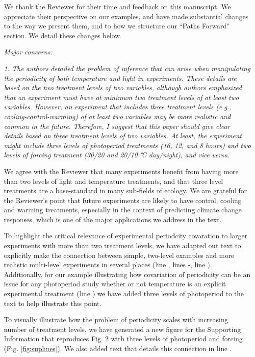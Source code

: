 \documentclass[11pt]{article}
\begin{document}
We thank the Reviewer for their time and feedback on this manuscript. We appreciate their perspective on our examples, and have made substantial changes to the way we present them, and to how we structure our ``Paths Forward" section. We detail these changes below.

\emph{Major concerns:}

\emph{1. The authors detailed the problem of inference that can arise when manipulating the periodicity of both temperature and light in experiments. These details are based on the two treatment levels of two variables, although authors emphasized that an experiment must have at minimum two treatment levels of at least two variables. However, an experiment that includes three treatment levels (e.g., cooling-control-warming) of at least two variables may be more realistic and common in the future. Therefore, I suggest that this paper should give clear details based on three treatment levels of two variables. At least, the experiment might include three levels of photoperiod treatments (16, 12, and 8 hours) and two levels of forcing treatment (30/20 and 20/10 ℃ day/night), and vice versa.}

We agree with the Reviewer that many experiments benefit from having more than two levels of light and temperature treatments, and that three level treatments are a base-standard in many sub-fields of ecology. We are grateful for the Reviewer's point that future experiments are likely to have control, cooling and warming treatments, especially in the context of predicting climate change responses, which is one of the major applications we address in the text.

To highlight the critical relevance of experimental periodcity covaration to larger experiments with more than two treatment levels, we have adapted out text to explicitly make the connection between simple, two-level examples and more realistic multi-level experiments in several places (line , lines -, line ). Additionally, for our example illustrating how covariation of periodicity can be an issue for any photoperiod study whether or not temperature is an explicit experimental treatment (line ) we have added three levels of photoperiod to the text to help illustrate this point. 

To visually illustrate how the problem of periodicity scales with increasing number of treatment levels, we have generated a new figure for the Supporting Information that reproduces Fig. 2 with three levels of photoperiod and forcing (Fig. \ref{fig:suplines}). We also added text that details this connection in line .
\end{document}

